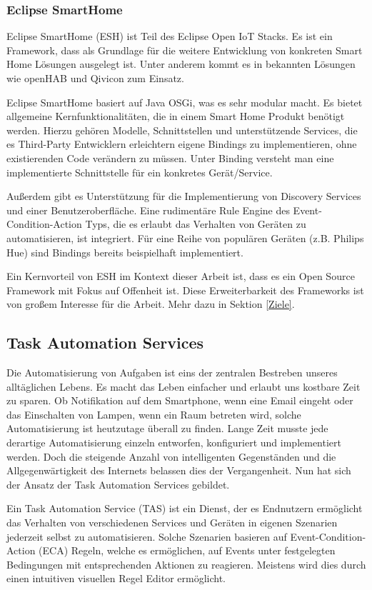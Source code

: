 \documentclass[12pt]{article}
\begin{document}
\subsubsection{Eclipse SmartHome}
Eclipse SmartHome (ESH)\cite{ESH} ist Teil des Eclipse Open IoT Stacks\cite{EOIoT}. Es ist ein Framework, dass als Grundlage für die weitere Entwicklung von konkreten Smart Home Lösungen ausgelegt ist. Unter anderem kommt es in bekannten Lösungen wie openHAB und Qivicon zum Einsatz.

Eclipse SmartHome basiert auf Java OSGi, was es sehr modular macht. Es bietet allgemeine Kernfunktionalitäten, die in einem Smart Home Produkt benötigt werden. Hierzu gehören Modelle, Schnittstellen und unterstützende Services, die es Third-Party Entwicklern erleichtern eigene Bindings zu implementieren, ohne existierenden Code verändern zu müssen. Unter Binding versteht man eine implementierte Schnittstelle für ein konkretes Gerät/Service. 

Außerdem gibt es Unterstützung für die Implementierung von Discovery Services  und einer Benutzeroberfläche. Eine rudimentäre Rule Engine des Event-Condition-Action Typs, die es erlaubt das Verhalten von Geräten zu automatisieren, ist integriert. Für eine Reihe von populären Geräten (z.B. Philips Hue) sind Bindings bereits beispielhaft implementiert.

Ein Kernvorteil von ESH im Kontext dieser Arbeit ist, dass es ein Open Source Framework mit Fokus auf Offenheit ist. Diese Erweiterbarkeit des Frameworks ist von großem Interesse für die Arbeit. Mehr dazu in Sektion \ref{Ziele}.

\subsection{Task Automation Services}
Die Automatisierung von Aufgaben ist eins der zentralen Bestreben unseres alltäglichen Lebens. Es macht das Leben einfacher und erlaubt uns kostbare Zeit zu sparen. Ob Notifikation auf dem Smartphone, wenn eine Email eingeht oder das Einschalten von Lampen, wenn ein Raum betreten wird, solche Automatisierung ist heutzutage überall zu finden. Lange Zeit musste jede derartige Automatisierung einzeln entworfen, konfiguriert und implementiert werden. Doch die steigende Anzahl von intelligenten Gegenständen und die Allgegenwärtigkeit des Internets belassen dies der Vergangenheit. Nun hat sich der Ansatz der Task Automation Services\cite{ieee:tas} gebildet.

Ein Task Automation Service (TAS) ist ein Dienst, der es Endnutzern ermöglicht das Verhalten von verschiedenen Services und Geräten in eigenen Szenarien jederzeit selbst zu automatisieren. Solche Szenarien basieren auf Event-Condition-Action (ECA)\cite{ECA} Regeln, welche es ermöglichen, auf Events unter festgelegten Bedingungen mit entsprechenden Aktionen zu reagieren. Meistens wird dies durch  einen intuitiven visuellen Regel Editor ermöglicht.
\end{document}
